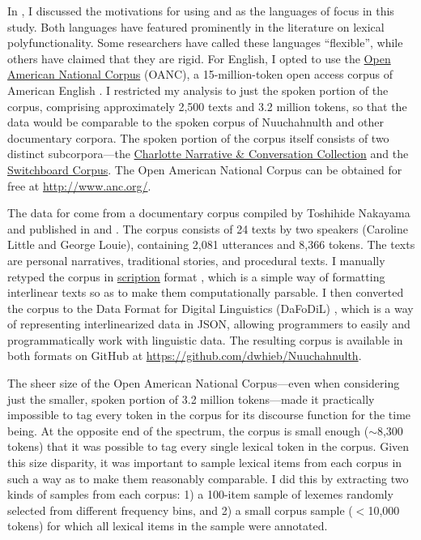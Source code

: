 In , I discussed the motivations for using  and  as the languages of focus in this study. Both languages have featured prominently in the literature on lexical polyfunctionality. Some researchers have called these languages \enquote{flexible}, while others have claimed that they are rigid. For English, I opted to use the \href{http://www.anc.org/}{Open American National Corpus} (OANC), a 15-million-token open access corpus of American English \parencite{OANC}. I restricted my analysis to just the spoken portion of the corpus, comprising approximately 2,500 texts and 3.2 million tokens, so that the data would be comparable to the spoken corpus of Nuuchahnulth and other documentary corpora. The spoken portion of the corpus itself consists of two distinct subcorpora—the \href{https://newsouthvoices.uncc.edu/}{Charlotte Narrative \& Conversation Collection}  and the \href{https://catalog.ldc.upenn.edu/LDC97S62}{Switchboard Corpus}. The Open American National Corpus can be obtained for free at \url{http://www.anc.org/}.

The data for  come from a documentary corpus compiled by Toshihide Nakayama and published in \textcite{Little2003} and \textcite{Louie2003}. The corpus consists of 24 texts by two speakers (Caroline Little and George Louie), containing 2,081 utterances and 8,366 tokens. The texts are personal narratives, traditional stories, and procedural texts. I manually retyped the corpus in \href{https://scription.digitallinguistics.io}{scription} format \parencite{Hieber2021b}, which is a simple way of formatting interlinear texts so as to make them computationally parsable. I then converted the corpus to the Data Format for Digital Linguistics (DaFoDiL) \parencite{Hieber2021a}, which is a way of representing interlinearized data in JSON, allowing programmers to easily and programmatically work with linguistic data. The resulting corpus is available in both formats on GitHub at \url{https://github.com/dwhieb/Nuuchahnulth}.

The sheer size of the Open American National Corpus—even when considering just the smaller, spoken portion of 3.2 million tokens—made it practically impossible to tag every token in the corpus for its discourse function for the time being. At the opposite end of the spectrum, the  corpus is small enough ($\sim$8,300 tokens) that it was possible to tag every single lexical token in the corpus. Given this size disparity, it was important to sample lexical items from each corpus in such a way as to make them reasonably comparable. I did this by extracting two kinds of samples from each corpus: 1) a 100-item sample of lexemes randomly selected from different frequency bins, and 2) a small corpus sample ($<$10,000 tokens) for which all lexical items in the sample were annotated.

